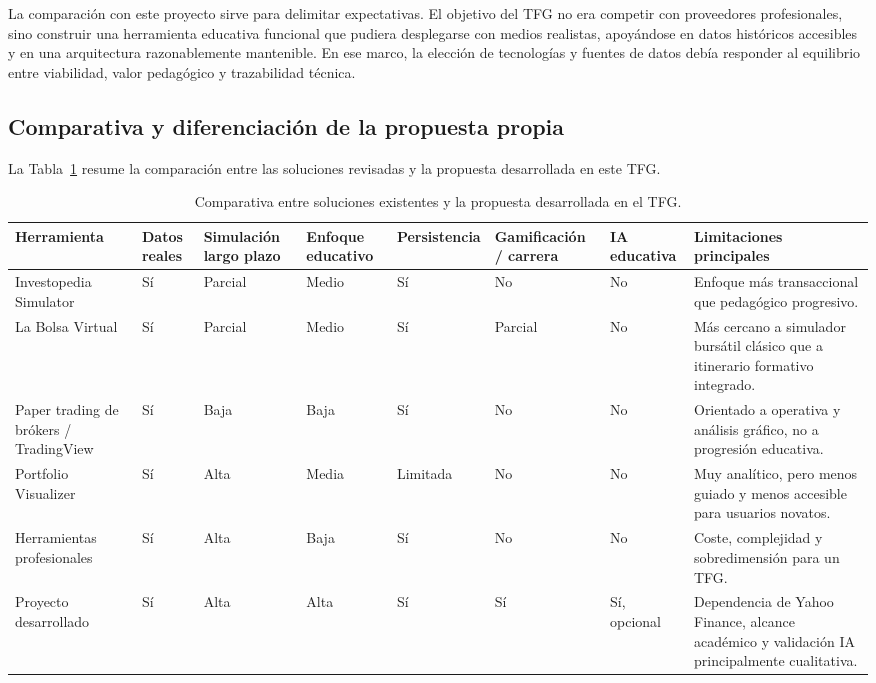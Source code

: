 La comparación con este proyecto sirve para delimitar expectativas. El objetivo del TFG no era competir con proveedores profesionales, sino construir una herramienta educativa funcional que pudiera desplegarse con medios realistas, apoyándose en datos históricos accesibles y en una arquitectura razonablemente mantenible. En ese marco, la elección de tecnologías y fuentes de datos debía responder al equilibrio entre viabilidad, valor pedagógico y trazabilidad técnica.

\subsection{Comparativa y diferenciación de la propuesta propia}

La Tabla~\ref{tab:comparativa_soluciones_existentes} resume la comparación entre las soluciones revisadas y la propuesta desarrollada en este TFG.

\begin{table}[htbp]
\centering
\small
\renewcommand{\arraystretch}{1.15}
\begin{tabular}{|p{}|p{}|p{}|p{}|p{}|p{}|p{}|p{}|}
\hline
\textbf{Herramienta} & \textbf{Datos reales} & \textbf{Simulación largo plazo} & \textbf{Enfoque educativo} & \textbf{Persistencia} & \textbf{Gamificación / carrera} & \textbf{IA educativa} & \textbf{Limitaciones principales} \\ \hline
Investopedia Simulator & Sí & Parcial & Medio & Sí & No & No & Enfoque más transaccional que pedagógico progresivo. \\ \hline
La Bolsa Virtual & Sí & Parcial & Medio & Sí & Parcial & No & Más cercano a simulador bursátil clásico que a itinerario formativo integrado. \\ \hline
Paper trading de brókers / TradingView & Sí & Baja & Baja & Sí & No & No & Orientado a operativa y análisis gráfico, no a progresión educativa. \\ \hline
Portfolio Visualizer & Sí & Alta & Media & Limitada & No & No & Muy analítico, pero menos guiado y menos accesible para usuarios novatos. \\ \hline
Herramientas profesionales & Sí & Alta & Baja & Sí & No & No & Coste, complejidad y sobredimensión para un TFG. \\ \hline
Proyecto desarrollado & Sí & Alta & Alta & Sí & Sí & Sí, opcional & Dependencia de Yahoo Finance, alcance académico y validación IA principalmente cualitativa. \\ \hline
\end{tabular}
\caption{Comparativa entre soluciones existentes y la propuesta desarrollada en el TFG.}
\label{tab:comparativa_soluciones_existentes}
\end{table}


